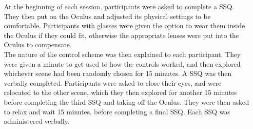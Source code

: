 At the beginning of each session, participants were asked to complete a SSQ. They then put on the Oculus and adjusted its physical settings to be comfortable. Participants with glasses were given the option to wear them inside the Oculus if they could fit, otherwise the appropriate lenses were put into the Oculus to compensate.\\

The nature of the control scheme was then explained to each participant. They were given a minute to get used to how the controls worked, and then explored whichever scene had been randomly chosen for 15 minutes. A SSQ was then verbally completed. Participants were asked to close their eyes, and were relocated to the other scene, which they then explored for another 15 minutes before completing the third SSQ and taking off the Oculus. They were then asked to relax and wait 15 minutes, before completing a final SSQ. Each SSQ was administered verbally.\\

